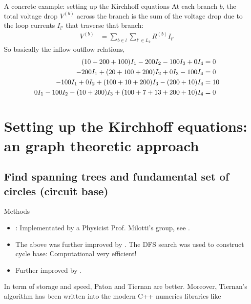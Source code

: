 \documentclass[xcolor=dvipsnames]{beamer}
\begin{document}
\begin{frame}{A concrete example: setting up the Kirchhoff equations}
At each branch $b$, the total voltage drop $V^{(b)}$ across the branch is the sum of the voltage drop due to the loop currents $I_{l'}$ that traverse that branch:
\begin{align*}
	V^{(b)} &= \sum_{b\in l}\sum_{l'\in L_b} R^{(b)}I_{l'}
\end{align*}
So basically the inflow outflow relations,
\begin{align}\label{eq1}
	(10 + 200 + 100)I_1 - 200 I_2 - 100 I_3 + 0 I_4 &= 0\\
	-200 I_1 + (20 + 100 + 200) I_2 + 0 I_3 - 100 I_4 &= 0\notag\\
	-100 I_1 + 0 I_2 + (100 + 10 + 200)I_3 - (200+10)I_4 &=10\notag\\
	0 I_1 - 100 I_2 - (10+200) I_3 + (100 + 7 + 13 + 200 + 10) I_4 &= 0\notag
\end{align}
\end{frame}

\section{Setting up the Kirchhoff equations: an graph theoretic approach }

\subsection{Find spanning trees and fundamental set of circles (circuit base)}

\begin{frame}{Methods}
	\begin{itemize}
		\item  \href{https://dl.acm.org/doi/pdf/10.1145/363848.363861}{}: Implementated by a Physicist Prof. Milotti's group, see \href{https://github.com/edymil/CircuitMath}{}.
		\item The above was further improved by \href{http://www.cs.kent.edu/~dragan/GraphAn/CycleBasis/p514-paton.pdf}{}. The DFS search was used to construct cycle base: Computational very efficient!
		\item Further improved by \href{https://dl.acm.org/doi/pdf/10.1145/362814.362819}{}. %
	\end{itemize}
	In term of storage and speed, Paton and Tiernan are better. Moreover, Tiernan's algorithm has been written into the modern C++ numerics libraries like \href{https://www.boost.org/}{}
\end{frame}
\end{document}
